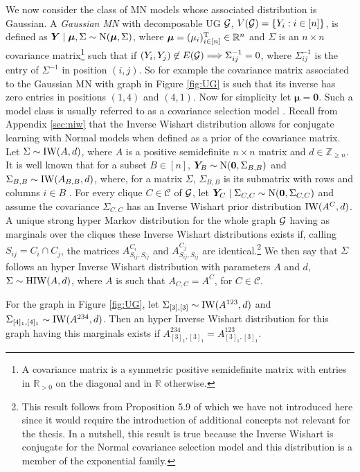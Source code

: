 We now consider the class of MN models whose associated distribution is Gaussian. A \emph{Gaussian MN} with decomposable UG $\mathcal{G}$, $V(\mathcal{G})=\{Y_i:i\in[n]\}$, is defined as $\bm{Y}\;|\;\bm{\mu},\Sigma\sim \textnormal{N}(\bm{\mu},\Sigma)$, where $\bm{\mu}=(\mu_i)^{\textnormal{T}}_{i\in[n]}\in\mathbb{R}^n$ and $\Sigma$ is an $n\times n$ covariance matrix\footnote{A covariance matrix is a symmetric positive semidefinite matrix with entries in $\mathbb{R}_{>0}$ on the diagonal and in $\mathbb{R}$ otherwise.} such that if $(Y_i,Y_j)\not\in E(\mathcal{G})\Longrightarrow \Sigma_{ij}^{-1}=0$, where $\Sigma_{ij}^{-1}$ is the entry of $\Sigma^{-1}$ in position $(i,j)$. So for example the covariance matrix associated to the Gaussian MN with graph in Figure \ref{fig:UG} is such that its inverse has zero entries in positions $(1,4)$ and $(4,1)$. Now for simplicity let $\bm{\mu}=\bm{0}$. Such a model class is usually referred to as a covariance selection model \citep{Wermuth1976}. Recall from Appendix \ref{sec:niw} that the Inverse Wishart distribution allows for conjugate learning with Normal models when defined as a prior of the covariance matrix. Let $\Sigma\sim \textnormal{IW}(A,d)$, where $A$ is a positive semidefinite $n\times n$ matrix and $d\in\mathbb{Z}_{\geq n}$. It is well known that for a subset $B\in[n]$, $\bm{Y}_{B}\sim \textnormal{N}(\bm{0},\Sigma_{B,B})$ and $\Sigma_{B,B}\sim \textnormal{IW}(A_{B,B},d)$, where, for a matrix $\Sigma$, $\Sigma_{B,B}$ is its submatrix with rows and columns $i\in B$ \citep[see e.g.][]{Dawid1993}. For every clique $C\in\mathcal{C}$ of $\mathcal{G}$, let $\bm{Y}_{C}\;|\;\Sigma_{C,C}\sim \textnormal{N}(\bm{0},\Sigma_{C,C})$ and assume the covariance  $\Sigma_{C,C}$ has an Inverse Wishart prior distribution $\textnormal{IW}(A^C,d)$. A unique strong hyper Markov distribution for the whole graph $\mathcal{G}$ having as marginals over the cliques these Inverse Wishart distributions exists if, calling $S_{ij}=C_i\cap C_j$, the matrices $A^{C_i}_{S_{ij},S_{ij}}$ and $A^{C_j}_{S_{ij},S_{ij}}$ are identical.\footnote{This result follows from Proposition 5.9 of \citet{Dawid1993} which we have not introduced here since it would require the introduction of additional concepts not relevant for the thesis. In a nutshell, this result is true because the Inverse Wishart is conjugate for the Normal covariance selection model and this distribution is a member of the exponential family.} We then say that $\Sigma$ follows an hyper Inverse Wishart distribution with parameters $A$ and $d$, $\Sigma\sim \textnormal{HIW}(A,d)$, where $A$ is such that $A_{C,C}=A^C$, for $C\in\mathcal{C}$.  

For the graph in Figure \ref{fig:UG}, let  $\Sigma_{[3],[3]}\sim \textnormal{IW}(A^{123},d)$ and $\Sigma_{[4]_1,[4]_1}\sim \textnormal{IW}(A^{234},d)$. Then an hyper Inverse Wishart distribution for this graph having this marginals exists if $A^{234}_{[3]_1,[3]_1}=A^{123}_{[3]_1,[3]_1}$.

